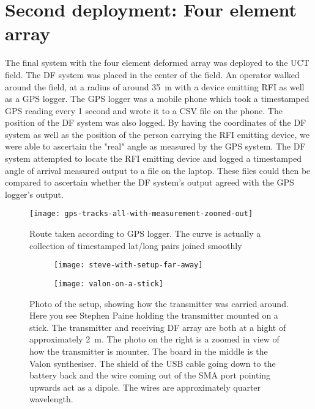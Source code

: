\section{Second deployment: Four element array}
The final system with the four element deformed array was deployed to the UCT field.
The DF system was placed in the center of the field. An operator walked around the field, at a radius of around \SI{35}{\meter} with a device emitting RFI as well as a GPS logger.
The GPS logger was a mobile phone which took a timestamped GPS reading every 1 second and wrote it to a CSV file on the phone. 
The position of the DF system was also logged. By having the coordinates of the DF system as well as the position of the person carrying the RFI emitting device, we were able to ascertain the "real" angle as measured by the GPS system.
The DF system attempted to locate the RFI emitting device and logged a timestamped angle of arrival measured output to a file on the laptop. These files could then be compared to ascertain whether the DF system's output agreed with the GPS logger's output.

\begin{figure}
  \centering
  \texttt{[image: gps-tracks-all-with-measurement-zoomed-out]}
  \caption{Route taken according to GPS logger. The curve is actually a collection of timestamped lat/long pairs joined smoothly}
  \label{fig:field-trails:gps-tracks-all}
\end{figure}

\begin{figure}
  \centering
  \begin{subfigure}[b]{0.74\textwidth}
    \centering
    \texttt{[image: steve-with-setup-far-away]}
  \end{subfigure}
  \begin{subfigure}[b]{0.25\textwidth}
    \centering
    \texttt{[image: valon-on-a-stick]}
  \end{subfigure}
  \caption{Photo of the setup, showing how the transmitter was carried around. Here you see Stephen Paine holding the transmitter mounted on a stick. The transmitter and receiving DF array are both at a hight of approximately \SI{2}{\meter}. The photo on the right is a zoomed in view of how the transmitter is mounter. The board in the middle is the Valon synthesiser. The shield of the USB cable going down to the battery back and the wire coming out of the SMA port pointing upwards act as a dipole. The wires are approximately quarter wavelength.}
\end{figure}


